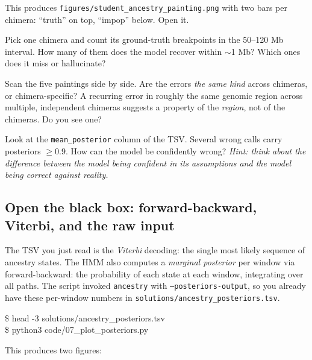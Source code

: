 \documentclass[11pt]{article}
\begin{document}
This produces \texttt{figures/student\_ancestry\_painting.png} with two
bars per chimera: ``truth'' on top, ``impop'' below. Open it.

\begin{quest}[3.1]
Pick one chimera and count its ground-truth breakpoints in the 50--120 Mb
interval. How many of them does the model recover within $\sim$1 Mb?
Which ones does it miss or hallucinate?
\end{quest}

\begin{quest}[3.2]
Scan the five paintings side by side. Are the errors \emph{the same kind}
across chimeras, or chimera-specific? A recurring error in roughly the
same genomic region across multiple, independent chimeras suggests a
property of the \emph{region}, not of the chimeras. Do you see one?
\end{quest}

\begin{quest}[3.3]
Look at the \texttt{mean\_posterior} column of the TSV. Several wrong
calls carry posteriors $\ge 0.9$. How can the model be confidently wrong?
\emph{Hint: think about the difference between the model being
confident in its assumptions and the model being correct against reality.}
\end{quest}

\subsection*{Open the black box: forward-backward, Viterbi, and the raw input}

The TSV you just read is the \emph{Viterbi} decoding: the single most
likely sequence of ancestry states. The HMM also computes a
\emph{marginal posterior} per window via forward-backward: the
probability of each state at each window, integrating over all paths.
The script invoked \texttt{ancestry} with \texttt{--posteriors-output},
so you already have these per-window numbers in
\texttt{solutions/ancestry\_posteriors.tsv}.

\begin{cmd}
\$ head -3 solutions/ancestry\_posteriors.tsv \\
\$ python3 code/07\_plot\_posteriors.py
\end{cmd}

This produces two figures:
\end{document}
